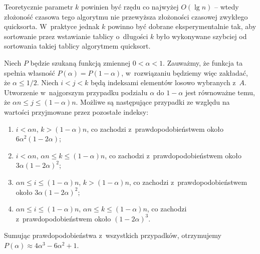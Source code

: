 Teoretycznie parametr $k$ powinien być rzędu co najwyżej $O(\lg n)$ -- wtedy złożoność czasowa tego algorytmu nie przewyższa złożoności czasowej zwykłego quicksorta.
W~praktyce jednak $k$ powinno być dobrane eksperymentalnie tak, aby sortowanie przez wstawianie tablicy o~długości $k$ było wykonywane szybciej od sortowania takiej tablicy algorytmem quicksort.

\exercise %
Niech $P$ będzie szukaną funkcją zmiennej $0<\alpha<1$.
Zauważmy, że funkcja ta spełnia własność $P(\alpha)=P(1-\alpha)$, w~rozwiązaniu będziemy więc zakładać, że $\alpha\le1/2$.
Niech $i<j<k$ będą indeksami elementów losowo wybranych z~$A$.
Utworzenie w~najgorszym przypadku podziału $\alpha$ do $1-\alpha$ jest równoważne temu, że $\alpha n\le j\le(1-\alpha)n$.
Możliwe są następujące przypadki ze względu na wartości przyjmowane przez pozostałe indeksy:
\begin{enumerate}
	\renewcommand{\labelenumi}{(\roman{enumi})}
	\item $i<\alpha n$, $k>(1-\alpha)n$, co zachodzi z~prawdopodobieństwem około $6\alpha^2(1-2\alpha)$;
	\item $i<\alpha n$, $\alpha n\le k\le(1-\alpha)n$, co zachodzi z~prawdopodobieństwem około $3\alpha(1-2\alpha)^2$;
	\item $\alpha n\le i\le(1-\alpha)n$, $k>(1-\alpha)n$, co zachodzi z~prawdopodobieństwem około $3\alpha(1-2\alpha)^2$;
	\item $\alpha n\le i\le(1-\alpha)n$, $\alpha n\le k\le(1-\alpha)n$, co zachodzi z~prawdopodobieństwem około $(1-2\alpha)^3$.
\end{enumerate}
Sumując prawdopodobieństwa z~wszystkich przypadków, otrzymujemy $P(\alpha)\approx4\alpha^3-6\alpha^2+1$.

